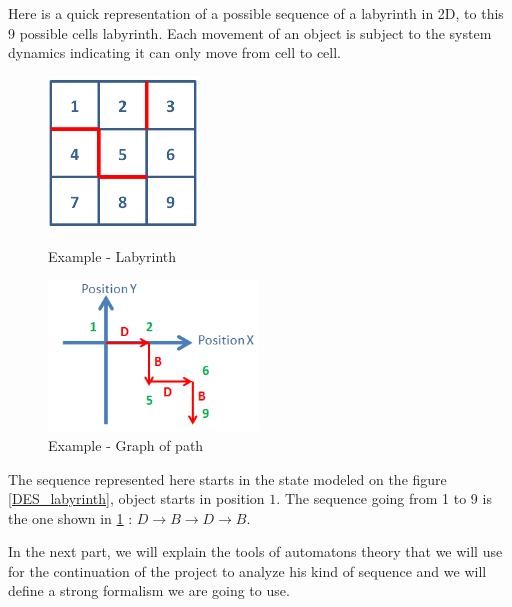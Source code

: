 Here is a quick representation of a possible sequence of a labyrinth in 2D, to this 9 possible cells labyrinth. Each movement of an object is subject to the system dynamics indicating it can only move from cell to cell.
\begin{figure}[H]
\begin{minipage}{0.5 \textwidth}	
      \begin{center}
      \includegraphics[height = 4cm]{./III/3x3lab.png}
       \caption{\label{DES_labyrinth}Example - Labyrinth} %
      \end{center}
\end{minipage}
\begin{minipage}{0.5 \textwidth}
\begin{center}
      \includegraphics[height = 4cm]{./III/3x3graphe.png}
      \caption{\label{DES_labyrinth_sequence}Example - Graph of path}
      \end{center}
\end{minipage}
\end{figure}

The sequence represented here starts in the state modeled on the figure \ref{DES_labyrinth}, object starts in position $1$. The sequence going from 1 to 9 is the one shown in \ref{DES_labyrinth_sequence} : $D \rightarrow B \rightarrow D \rightarrow B$. 

In the next part, we will explain the tools of automatons theory that we will use for the continuation of the project to analyze his kind of sequence and we will define a strong formalism we are going to use.

